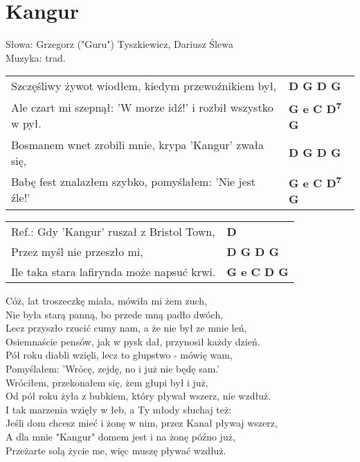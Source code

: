 \section{Kangur}

Słowa: Grzegorz ("Guru") Tyszkiewicz, Dariusz Ślewa \\
Muzyka:  trad.

\vspace{2em}
\begin{tabular}{@{}p{10cm}@{}l@{}}
Szczęśliwy żywot wiodłem, kiedym przewoźnikiem był, & \bfseries  D G D G \\
Ale czart mi szepnął: 'W morze idź!' i rozbił wszystko w pył. & \bfseries  G e C D\textsuperscript{7} G \\
Bosmanem wnet zrobili mnie, krypa 'Kangur' zwała się, & \bfseries  D G D G \\
Babę fest znalazłem szybko, pomyślałem: 'Nie jest źle!' & \bfseries  G e C D\textsuperscript{7} G \\
\end{tabular}

\vspace{1em}
\begin{tabular}{@{}p{10cm}@{}l@{}}
Ref.: Gdy 'Kangur' ruszał z Bristol Town, & \bfseries  D \\
Przez myśl nie przeszło mi, & \bfseries  D G D G \\
Ile taka stara lafirynda może napsuć krwi. & \bfseries  G e C D G \\
\end{tabular}

\vspace{1em}
Cóż, lat troszeczkę miała, mówiła mi żem zuch, \\
Nie była starą panną, bo przede mną padło dwóch, \\
Lecz przyszło rzucić cumy nam, a że nie był ze mnie leń, \\
Osiemnaście pensów, jak w pysk dał, przynosił każdy dzień. \\

Pół roku diabli wzięli, lecz to głupstwo - mówię wam, \\
Pomyślałem: 'Wrócę, zejdę, no i już nie będę sam.' \\
Wróciłem, przekonałem się, żem głupi był i już, \\
Od pół roku żyła z bubkiem, który pływał wszerz, nie wzdłuż. \\

I tak marzenia wzięły w łeb, a Ty młody słuchaj też: \\
Jeśli dom chcesz mieć i żonę w nim, przez Kanał pływaj wszerz, \\
A dla mnie "Kangur" domem jest i na żonę późno już, \\
Przeżarte solą życie me, więc muszę pływać wzdłuż. \\